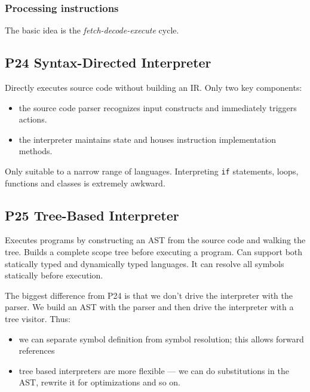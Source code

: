 \subsubsection{Processing instructions}
The basic idea is the \emph{fetch-decode-execute} cycle.


\subsection{P24 Syntax-Directed Interpreter}

Directly executes source code without building an IR.
Only two key components:
\begin{itemize}
\item the source code parser recognizes input constructs
and immediately triggers actions.
\item the interpreter maintains state
and houses instruction implementation methods.
\end{itemize}

Only suitable to a narrow range of languages.
Interpreting \verb=if= statements, loops, functions and classes
is extremely awkward.


\subsection{P25 Tree-Based Interpreter}
Executes programs by constructing an AST from the source code
and walking the tree.
Builds a complete scope tree before executing a program.
Can support both statically typed and dynamically typed languages.
It can resolve all symbols statically before execution.

The biggest difference from P24
is that we don't drive the interpreter with the parser.
We build an AST with the parser
and then drive the interpreter with a tree visitor.
Thus:
\begin{itemize}
\item we can separate symbol definition from symbol resolution;
this allows forward references
\item tree based interpreters are more flexible ---
we can do substitutions in the AST, rewrite it for optimizations and so on.
\end{itemize}
